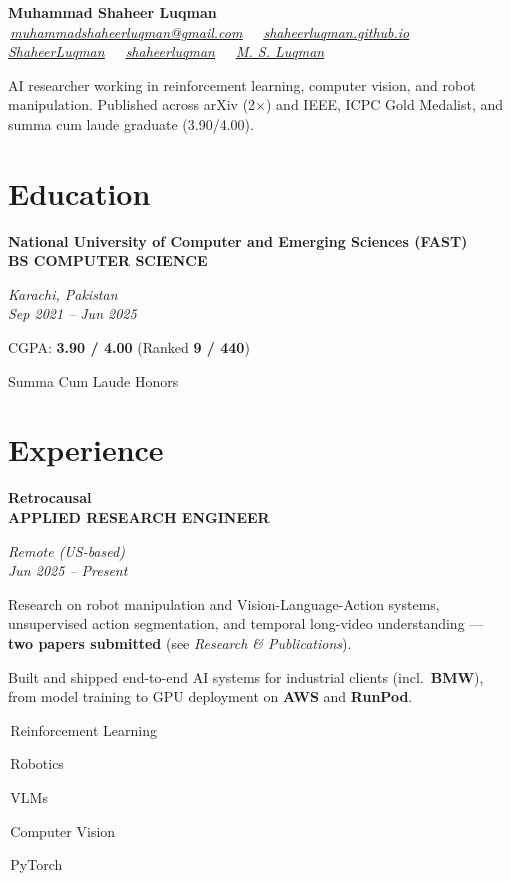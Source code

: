 \documentclass[10pt,a4paper]{article}
\let\orighref\href
\renewcommand{\href}[2]{\orighref{#1}{\uline{\textit{#2}}}}
\newlength{\datew}
\newlength{\entryskip}\setlength{\entryskip}{10pt}
\newcommand{\firstentry}{\vspace{\parskip}\vspace{-\entryskip}\vspace{2pt}}
\newlength{\entrylocw}
\newcommand{\gridentryline}[4]{%
  \noindent\begingroup
  \settowidth{\entrylocw}{\itshape #2}%
  \settowidth{\datew}{\itshape\small #4}%
  \ifdim\datew>\entrylocw \setlength{\entrylocw}{\datew}\fi
  \parbox[t]{\dimexpr\linewidth-\entrylocw-1em\relax}{\raggedright\bfseries\color{heading}#1\\[2pt]{\small\color{muted}\MakeUppercase{#3}}}%
  \hfill
  \parbox[t]{\entrylocw}{\raggedleft\itshape\color{accent}#2\\[2pt]{\itshape\small\color{muted}#4}}%
  \par
  \endgroup
}
\newcommand{\gridentry}[4]{%
  \par\vspace{-\parskip}\vspace{\entryskip}\vspace{-2pt}%
  \gridentryline{#1}{#2}{#3}{#4}%
}
\newcommand{\chip}[1]{%
  \setlength{\fboxsep}{2pt}%
  \colorbox{chipbg}{\color{accentdk}\small\strut\,#1\,}\hspace{2pt}}
\begin{document}
\begin{center}
{\fontsize{26}{30}\selectfont\bfseries\color{accent}Muhammad Shaheer Luqman}\\[5pt]
{\footnotesize\color{heading}
\faEnvelope[regular]\,\href{mailto:muhammadshaheerluqman@gmail.com}{muhammadshaheerluqman@gmail.com}
~\textbar~\faHome\,\href{https://shaheerluqman.github.io/}{shaheerluqman.github.io}
~\textbar~\faGithub\,\href{https://github.com/ShaheerLuqman}{ShaheerLuqman}
~\textbar~\faLinkedin\,\href{http://linkedin.com/in/shaheerluqman}{shaheerluqman}
~\textbar~\faGraduationCap\,\href{https://scholar.google.com/citations?user=I3TSLaAAAAAJ&hl=en}{M. S. Luqman}
}
\end{center}

\vspace{3pt}
{\color{body}AI researcher working in reinforcement learning, computer vision, and robot manipulation. Published across arXiv (2$\times$) and IEEE, ICPC Gold Medalist, and summa cum laude graduate (3.90/4.00).}

\section{Education}
\firstentry
\gridentry{National University of Computer and Emerging Sciences (FAST)}{Karachi, Pakistan}{BS Computer Science}{Sep 2021 -- Jun 2025}
\begin{tight}
  \item CGPA: \textbf{3.90 / 4.00} (Ranked \textbf{9 / 440})
  \item Summa Cum Laude Honors
\end{tight}

\section{Experience}
\firstentry
\gridentry{Retrocausal}{Remote (US-based)}{Applied Research Engineer}{Jun 2025 -- Present}
\vspace{3pt}
\begin{tight}
  \item Research on robot manipulation and Vision-Language-Action systems, unsupervised action segmentation, and temporal long-video understanding --- \textbf{two papers submitted} (see \textit{Research \& Publications}).
  \item Built and shipped end-to-end AI systems for industrial clients (incl.\ \textbf{BMW}), from model training to GPU deployment on \textbf{AWS} and \textbf{RunPod}.
\end{tight}
\vspace{3pt}
{\footnotesize\chip{Reinforcement Learning}\chip{Robotics}\chip{VLMs}\chip{Computer Vision}\chip{PyTorch}}
\end{document}
